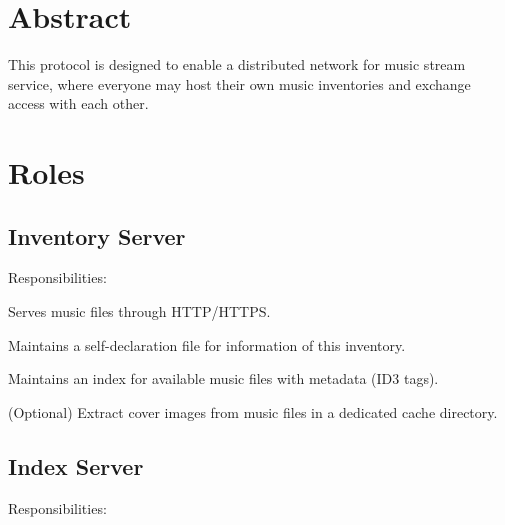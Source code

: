 \documentclass[a4paper,11pt]{article}
\begin{document}
\fulldoctitle






\section*{Abstract}

This protocol is designed to enable a distributed network for music stream service,
where everyone may host their own music inventories and exchange access with each other.










\Nmaketoc\clearpage












\section{Roles}



\subsection{Inventory Server}

Responsibilities:

\begin{compactitem}
	\item Serves music files through HTTP/HTTPS.
	\item Maintains a self-declaration file for information of this inventory.
	\item Maintains an index for available music files with metadata (ID3 tags).
	\item (Optional) Extract cover images from music files in a dedicated cache directory.
\end{compactitem}



\subsection{Index Server}

Responsibilities:
\end{document}
